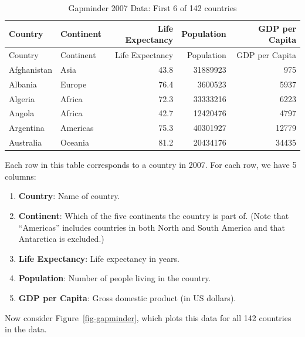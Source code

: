 \documentclass[
  letterpaper,
  DIV=11,
  numbers=noendperiod]{scrreprt}
\providecommand{\tightlist}{%
  \setlength{\itemsep}{0pt}\setlength{\parskip}{0pt}}\usepackage{longtable,booktabs,array}
\theoremstyle{definition}
\theoremstyle{remark}
\begin{document}
\hypertarget{tbl-gapminder-2007}{}
\begin{longtable}[]{@{}llrrr@{}}
\caption{\label{tbl-gapminder-2007}Gapminder 2007 Data: First 6 of 142
countries}\tabularnewline
\toprule()
Country & Continent & Life Expectancy & Population & GDP per Capita \\
\midrule()
\endfirsthead
\toprule()
Country & Continent & Life Expectancy & Population & GDP per Capita \\
\midrule()
\endhead
Afghanistan & Asia & 43.8 & 31889923 & 975 \\
Albania & Europe & 76.4 & 3600523 & 5937 \\
Algeria & Africa & 72.3 & 33333216 & 6223 \\
Angola & Africa & 42.7 & 12420476 & 4797 \\
Argentina & Americas & 75.3 & 40301927 & 12779 \\
Australia & Oceania & 81.2 & 20434176 & 34435 \\
\bottomrule()
\end{longtable}

Each row in this table corresponds to a country in 2007. For each row,
we have 5 columns:

\begin{enumerate}
\def\labelenumi{\arabic{enumi}.}
\tightlist
\item
  \textbf{Country}: Name of country.
\item
  \textbf{Continent}: Which of the five continents the country is part
  of. (Note that ``Americas'' includes countries in both North and South
  America and that Antarctica is excluded.)
\item
  \textbf{Life Expectancy}: Life expectancy in years.
\item
  \textbf{Population}: Number of people living in the country.
\item
  \textbf{GDP per Capita}: Gross domestic product (in US dollars).
\end{enumerate}

Now consider Figure~\ref{fig-gapminder}, which plots this data for all
142 countries in the data.
\end{document}
